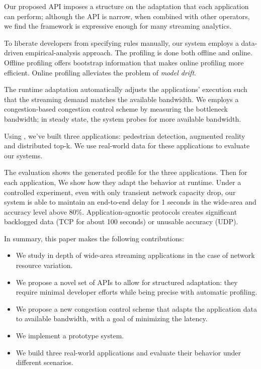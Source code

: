 Our proposed API imposes a structure on the adaptation that each application can
perform; although the API is narrow, when combined with other operators, we find
the framework is expressive enough for many streaming analytics.

To liberate developers from specifying rules manually, our system employs a
data-driven empirical-analysis approach. The profiling is done both offline and
online. Offline profiling offers bootstrap information that makes online
profiling more efficient. Online profiling alleviates the problem of
\textit{model drift}.

The runtime adaptation automatically adjusts the applications' execution such
that the streaming demand matches the available bandwidth. We employs a
congestion-based congestion control scheme by measuring the bottleneck
bandwidth; in steady state, the system probes for more available bandwidth.

Using \sysname{}, we've built three applications: pedestrian detection,
augmented reality and distributed top-k. We use real-world data for these
applications to evaluate our systems.

The evaluation shows the generated profile for the three applications. Then for
each application, We show how they adapt the behavior at runtime. Under a
controlled experiment, even with only transient network capacity drop, our
system is able to maintain an end-to-end delay for 1 seconds in the wide-area
and accuracy level above 80\%. Application-agnostic protocols creates
significant backlogged data (TCP for about 100 seconds) or unusable accuracy
(UDP).

In summary, this paper makes the following contributions:

\begin{itemize}[leftmargin=16pt]
\item We study in depth of wide-area streaming applications in the case of
  network resource variation.
\item We propose a novel set of APIs to allow for structured adaptation: they
  require minimal developer efforts while being precise with automatic
  profiling.
\item We propose a new congestion control scheme that adapts the application
  data to available bandwidth, with a goal of minimizing the latency.
\item We implement a prototype system.
\item We build three real-world applications and evaluate their behavior
  under different scenarios.
\end{itemize}

